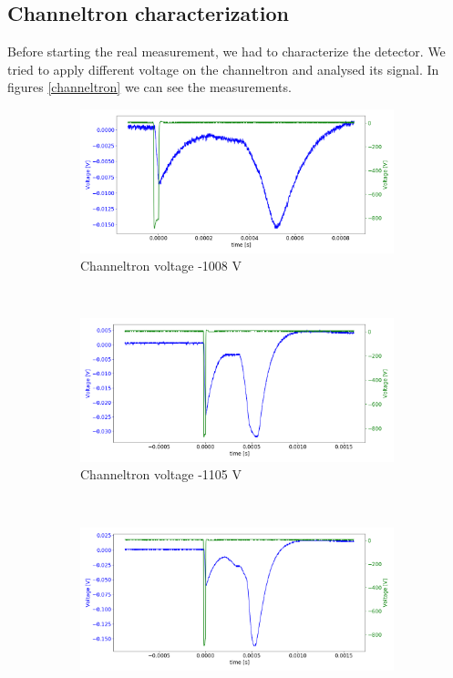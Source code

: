 \documentclass[a4paper,10pt]{article}
\begin{document}
\subsection{Channeltron characterization}
Before starting the real measurement, we had to characterize the detector. We tried to apply different voltage on the channeltron and analysed its signal. In figures \ref{channeltron}
we can see the measurements. 
\begin{figure}[H]
  \centering{}
  \begin{subfigure}[t]{0.45 \textwidth}
    \centering
    \includegraphics[width= \textwidth]{channeltron1}
    \caption{Channeltron voltage -1008 V}
  \end{subfigure}
  ~
  \begin{subfigure}[t]{0.45 \textwidth}
    \centering
    \includegraphics[width=\textwidth]{channeltron2}
    \caption{Channeltron voltage -1105 V}
  \end{subfigure}
  ~
  \begin{subfigure}[t]{0.45 \textwidth}
    \centering
    \includegraphics[width=\textwidth]{channeltron3}

\end{subfigure}
\end{figure}
\end{document}
